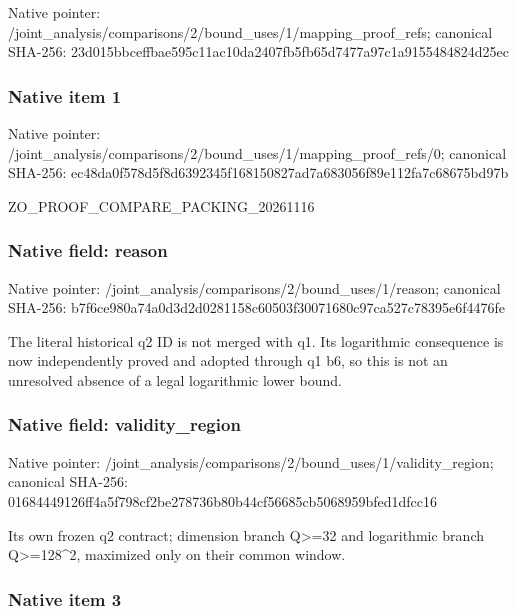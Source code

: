\documentclass[10pt,a4paper]{article}
\begin{document}
Native pointer: /joint\_analysis/comparis\allowbreak{}ons/2/bound\_uses/1/mappi\allowbreak{}ng\_proof\_refs; canonical SHA-256: 23d015bbceffbae595c11ac1\allowbreak{}0da2407fb5fb65d7477a97c1\allowbreak{}a9155484824d25ec



\subsubsection{Native item 1}


Native pointer: /joint\_analysis/comparis\allowbreak{}ons/2/bound\_uses/1/mappi\allowbreak{}ng\_proof\_refs/0; canonical SHA-256: ec48da0f578d5f8d6392345f\allowbreak{}168150827ad7a683056f89e1\allowbreak{}12fa7c68675bd97b


ZO\_PROOF\_COMPARE\_PACKING\_20261116


\subsubsection{Native field: reason}


Native pointer: /joint\_analysis/comparis\allowbreak{}ons/2/bound\_uses/1/reaso\allowbreak{}n; canonical SHA-256: b7f6ce980a74a0d3d2d02811\allowbreak{}58c60503f30071680c97ca52\allowbreak{}7c78395e6f4476fe


The literal historical q2 ID is not merged with q1. Its logarithmic consequence is now independently proved and adopted through q1 b6, so this is not an unresolved absence of a legal logarithmic lower bound.


\subsubsection{Native field: validity\_region}


Native pointer: /joint\_analysis/comparis\allowbreak{}ons/2/bound\_uses/1/valid\allowbreak{}ity\_region; canonical SHA-256: 01684449126ff4a5f798cf2b\allowbreak{}e278736b80b44cf56685cb50\allowbreak{}68959bfed1dfcc16


Its own frozen q2 contract; dimension branch Q>=32 and logarithmic branch Q>=128\textasciicircum{}2, maximized only on their common window.


\subsubsection{Native item 3}
\end{document}

